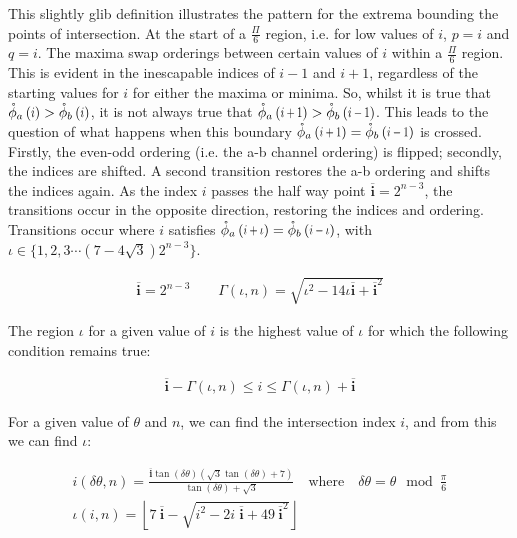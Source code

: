 \newcommand{\meanIndx}{\overline{\mathbf{i}}}

This slightly glib definition illustrates the pattern for the extrema bounding the points of intersection. At the start of a $\frac{\Pi}{6}$ region, i.e. for low values of $i$, $p=i$ and $q=i$. The maxima swap orderings between certain values of $i$ within a $\frac{\Pi}{6}$ region. This is evident in the inescapable indices of $i-1$ and $i+1$, regardless of the starting values for $i$ for either the maxima or minima. So, whilst it is true that $\extremaTheta{a} {i} > \extremaTheta{b} {i}$, it is not always true that $\extremaTheta{a} {i+1} > \extremaTheta{b} {i-1}$. This leads to the question of what happens when this boundary $\extremaTheta{a} {i+1} = \extremaTheta{b} {i-1}$ is crossed. Firstly, the even-odd ordering (i.e. the a-b channel ordering) is flipped; secondly, the indices are shifted. A second transition restores the a-b ordering and shifts the indices again. As the index $i$ passes the half way point $\meanIndx = 2^{n-3}$, the transitions occur in the opposite direction, restoring the indices and ordering. Transitions occur where $i$ satisfies $\extremaTheta{a} {i+\iota} = \extremaTheta{b} {i-\iota}$, with $\iota \in \{ 1,2,3 \cdots \left(7-4 \sqrt{3}\right) 2^{n-3}\} $. 

\begin{gather*}
\meanIndx = 2^{n-3} \qquad
\varGamma(\iota, n) = \sqrt{\iota ^2 - 14 \iota \meanIndx + \meanIndx^{2} } 
\end{gather*}

The region $\iota$ for a given value of $i$ is the highest value of $\iota$ for which the following condition remains true:

\begin{gather*}
\meanIndx -\varGamma(\iota, n) \leq i \leq \varGamma(\iota, n) + \meanIndx 
\end{gather*}

For a given value of $\theta$ and $n$, we can find the intersection index $i$, and from this we can find $\iota$:

\begin{gather}\label{eq:indexFromTheta}
i(\delta\theta, n) = \frac{\meanIndx \tan (\delta \theta ) \left(\sqrt{3} \tan (\delta \theta )+7\right)}{\tan (\delta \theta )+\sqrt{3}} 
\quad \text{where} \quad \delta\theta = \theta \mod{\frac{\pi}{6} }\\
 \iota(i,n)  = \left\lfloor 7\ \meanIndx-\sqrt{i^2 - 2 i \; \meanIndx + 49\ \meanIndx^2 }\right\rfloor 
\end{gather}

